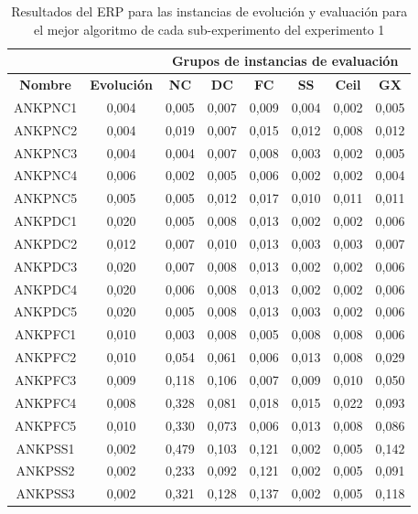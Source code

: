 \begin{table}[hbtp!]
\caption{Resultados del ERP para las instancias de evolución y evaluación para el mejor algoritmo de cada sub-experimento del experimento 1}\label{tab:evol_vs_eval_completa_exp1}
\small
\centering
\begin{center}
\begin{tabular}{cc|cccccc}
\multicolumn{2}{c|}{{\textbf{}}} & \multicolumn{6}{c}{{\textbf{Grupos de instancias de evaluación}}} \\ \hline
{\textbf{Nombre}} & {\textbf{Evolución}} & {\textbf{NC}} & {\textbf{DC}} & {\textbf{FC}} & {\textbf{SS}} & {\textbf{Ceil}} & {\textbf{GX}} \\ \hline
ANKPNC1 & 0,004 & 0,005 & 0,007 & 0,009 & 0,004 & 0,002 & 0,005 \\
ANKPNC2 & 0,004 & 0,019 & 0,007 & 0,015 & 0,012 & 0,008 & 0,012 \\
ANKPNC3 & 0,004 & 0,004 & 0,007 & 0,008 & 0,003 & 0,002 & 0,005 \\
ANKPNC4 & 0,006 & 0,002 & 0,005 & 0,006 & 0,002 & 0,002 & 0,004 \\
ANKPNC5 & 0,005 & 0,005 & 0,012 & 0,017 & 0,010 & 0,011 & 0,011 \\ \hline
ANKPDC1 & 0,020 & 0,005 & 0,008 & 0,013 & 0,002 & 0,002 & 0,006 \\
ANKPDC2 & 0,012 & 0,007 & 0,010 & 0,013 & 0,003 & 0,003 & 0,007 \\
ANKPDC3 & 0,020 & 0,007 & 0,008 & 0,013 & 0,002 & 0,002 & 0,006 \\
ANKPDC4 & 0,020 & 0,006 & 0,008 & 0,013 & 0,002 & 0,002 & 0,006 \\
ANKPDC5 & 0,020 & 0,005 & 0,008 & 0,013 & 0,003 & 0,002 & 0,006 \\ \hline
ANKPFC1 & 0,010 & 0,003 & 0,008 & 0,005 & 0,008 & 0,008 & 0,006 \\
ANKPFC2 & 0,010 & 0,054 & 0,061 & 0,006 & 0,013 & 0,008 & 0,029 \\
ANKPFC3 & 0,009 & 0,118 & 0,106 & 0,007 & 0,009 & 0,010 & 0,050 \\
ANKPFC4 & 0,008 & 0,328 & 0,081 & 0,018 & 0,015 & 0,022 & 0,093 \\
ANKPFC5 & 0,010 & 0,330 & 0,073 & 0,006 & 0,013 & 0,008 & 0,086 \\ \hline
ANKPSS1 & 0,002 & 0,479 & 0,103 & 0,121 & 0,002 & 0,005 & 0,142 \\
ANKPSS2 & 0,002 & 0,233 & 0,092 & 0,121 & 0,002 & 0,005 & 0,091 \\
ANKPSS3 & 0,002 & 0,321 & 0,128 & 0,137 & 0,002 & 0,005 & 0,118 \\

\end{tabular}
\end{center}
\end{table}
